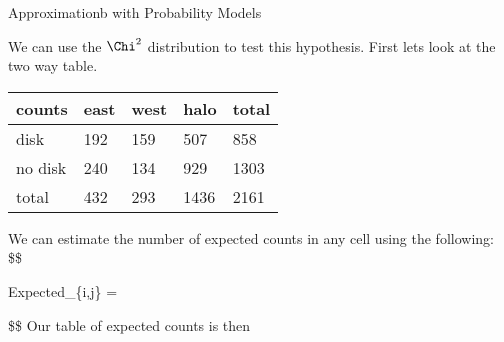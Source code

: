 \documentclass[]{article}
\begin{document}
Approximationb with Probability Models

We can use the \(\Chi^{2}\) distribution to test this hypothesis. First
lets look at the two way table.

\begin{longtable}[]{@{}lllll@{}}
\toprule
counts & east & west & halo & total\tabularnewline
\midrule
\endhead
disk & 192 & 159 & 507 & 858\tabularnewline
no disk & 240 & 134 & 929 & 1303\tabularnewline
total & 432 & 293 & 1436 & 2161\tabularnewline
\bottomrule
\end{longtable}

We can estimate the number of expected counts in any cell using the
following: \$\$

Expected\_\{i,j\} = 

\$\$ Our table of expected counts is then
\end{document}
